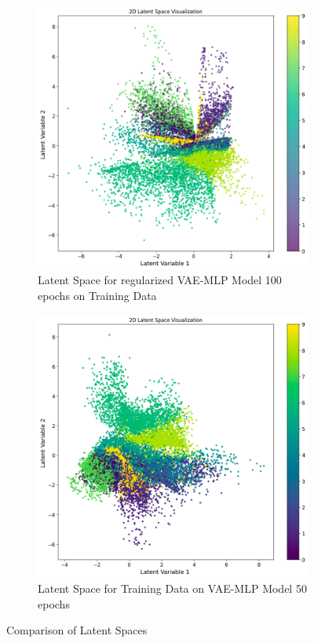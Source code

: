 \documentclass[12pt]{article}
\begin{document}
\begin{figure}[htbp]
    \centering
    \begin{subfigure}[b]{0.45\linewidth}
        \centering
        \includegraphics[width=\linewidth]{mlp100r_train.png}
        \caption{Latent Space for regularized VAE-MLP Model 100 epochs on Training Data}
        \label{fig:sub1}
    \end{subfigure}
    \hfill
    \begin{subfigure}[b]{0.45\linewidth}
        \centering
        \includegraphics[width=\linewidth]{abc.png}
        \caption{Latent Space for Training Data on VAE-MLP Model 50 epochs}
        \label{fig:sub2}
    \end{subfigure}
    \caption{Comparison of Latent Spaces}
    \label{fig:main_figure}
\end{figure}
\end{document}
